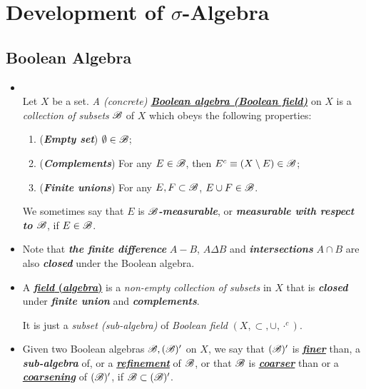 \documentclass[11pt]{article}
\begin{document}
\section{Development of $\sigma$-Algebra}
\subsection{Boolean Algebra}
\begin{itemize}
\item \begin{definition} \citep{tao2011introduction}\\
Let $X$ be a set. \emph{A (concrete) \underline{\textbf{Boolean algebra (Boolean field)}}} on $X$ is a \emph{collection of subsets} ${\mathscr B}$ of $X$ which obeys the following
properties:
\begin{enumerate}
\item (\textbf{\emph{Empty set}}) $\emptyset \in {\mathscr B}$;
\item (\textbf{\emph{Complements}}) For any $E\in {\mathscr B}$, then $E^{c}\equiv (X \setminus E) \in {\mathscr B}$;
\item (\textbf{\emph{Finite unions}}) For any  $E, F \subset {\mathscr B}$, $E\cup F \in {\mathscr B}$.
\end{enumerate}
We sometimes say that $E$ is \textbf{\emph{${\mathscr B}$-measurable}}, or \textbf{\emph{measurable with respect to ${\mathscr B}$}}, if $E \in {\mathscr B}$.
\end{definition}

\item \begin{remark}
Note that \emph{\textbf{the finite difference}} $A-B$, $A\Delta B$ and \emph{\textbf{intersections}} $A\cap B$ are also \emph{\textbf{closed}} under the Boolean algebra. 
\end{remark}

\item \begin{definition}
A \underline{\textbf{\emph{field} (\emph{algebra})}} is a \emph{non-empty collection of subsets} in $X$ that is \emph{\textbf{closed}} under \emph{\textbf{finite union}} and \emph{\textbf{complements}}. 

It is just a \emph{subset (sub-algebra)} of \emph{Boolean field} $(X, \subset, \cup, \cdot^{c})$. 
\end{definition} 

\item \begin{definition}
Given two Boolean algebras ${\mathscr B}, ({\mathscr B})'$ on $X$, we say that $({\mathscr B})'$ is \underline{\emph{\textbf{finer}}} than, a \emph{\textbf{sub-algebra}} of, or a \underline{\emph{\textbf{refinement}}} of ${\mathscr B}$, or that ${\mathscr B}$ is \underline{\emph{\textbf{coarser}}} than or a \underline{\emph{\textbf{coarsening}}} of $({\mathscr B})'$, if ${\mathscr B} \subset ({\mathscr B})'$.
\end{definition}


\end{itemize}
\end{document}
